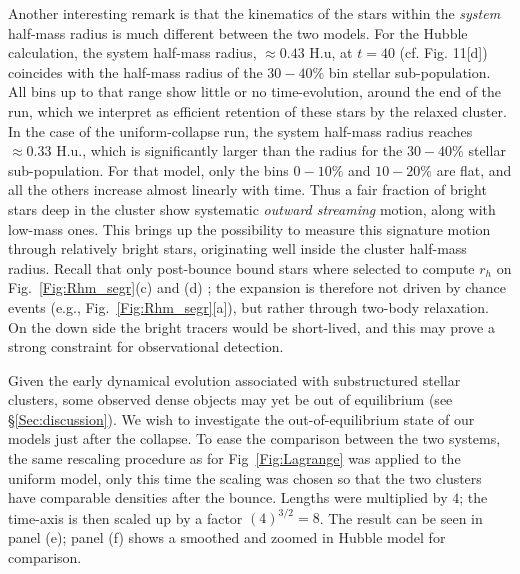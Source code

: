 Another interesting remark is that the kinematics of the stars within the {\it system} half-mass radius is much different between the two models. For the Hubble calculation, the system half-mass radius, $ \approx 0.43 $ H.u, at $t = 40$ (cf. Fig. 11[d]) coincides with the half-mass radius of the $30-40\%$ bin stellar sub-population. All bins up to that range show little or no time-evolution, around the end of the run, which we interpret as efficient retention of these stars by the relaxed cluster. In the case of the uniform-collapse run, the system half-mass radius reaches $\approx 0.33$ H.u., which is significantly larger than the radius for the $30-40\%$ stellar sub-population. For that model, only the bins $0-10\%$ and $10-20\%$ are flat, and all the others increase almost linearly with time. Thus a fair fraction of bright stars deep in the cluster show systematic {\it outward streaming} motion, along with low-mass ones. This brings up the possibility to measure this signature motion through relatively bright stars, originating well inside the cluster half-mass radius. Recall that only post-bounce bound stars where selected to compute $r_h$ on Fig.~\ref{Fig:Rhm_segr}(c) and (d) ; the expansion is therefore not driven by chance events (e.g., Fig.~\ref{Fig:Rhm_segr}[a]), but rather through two-body relaxation. On the down side the bright tracers would be short-lived, and this may prove a strong constraint for observational detection.


Given the early dynamical evolution associated with substructured stellar clusters, some observed dense objects may yet be out of equilibrium (see \S\ref{Sec:discussion}). We wish to investigate the out-of-equilibrium state of our models just after the collapse. To ease the comparison between the two systems, the same rescaling procedure as for Fig~\ref{Fig:Lagrange} was applied to the uniform model, only this time the scaling was chosen so that the two clusters have comparable densities after the bounce. Lengths were multiplied by $4$; the time-axis is then scaled up by a factor $(4)^{3/2} = 8$. The result can be seen in panel (e); panel (f) shows a smoothed and zoomed in Hubble model for comparison.



